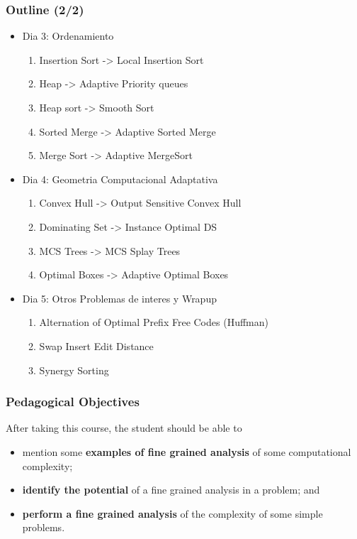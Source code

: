 \documentclass{beamer}
\begin{document}
\begin{frame}
  \frametitle{Outline (2/2)}
\begin{itemize}
\item {Dia 3: Ordenamiento}
\label{sec-3}
\begin{enumerate}
\item Insertion Sort -> Local Insertion Sort
\item Heap -> Adaptive Priority queues
\item Heap sort -> Smooth Sort
\item Sorted Merge -> Adaptive Sorted Merge
\item Merge Sort -> Adaptive MergeSort
\end{enumerate}
\vfill

\item {Dia 4: Geometria Computacional Adaptativa}
\label{sec-4}
\begin{enumerate}
\item Convex Hull -> Output Sensitive Convex Hull
\item Dominating Set -> Instance Optimal DS
\item MCS Trees -> MCS Splay Trees
\item Optimal Boxes -> Adaptive Optimal Boxes
\end{enumerate}
\vfill
\item {Dia 5: Otros Problemas de interes y Wrapup}
\label{sec-5}
\begin{enumerate}
\item Alternation of Optimal Prefix Free Codes (Huffman)
\item Swap Insert Edit Distance
\item Synergy Sorting
\end{enumerate}
\end{itemize}

\end{frame}

\begin{frame}
\frametitle{Pedagogical Objectives}
After taking this course, the student should be able to
\hfill
\begin{itemize}
\item mention some \textbf{examples of fine grained analysis} of some computational complexity;
\item \textbf{identify the potential} of a fine grained analysis in a problem; and
\item \textbf{perform a fine grained analysis} of the complexity of some simple problems.
\end{itemize}
\end{frame}
\end{document}
